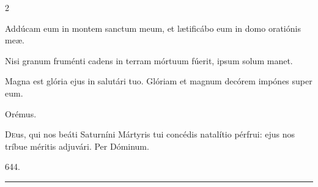 \documentclass[9pt,twoside]{extarticle}
\begin{document}
\begin{multicols}{2}
\begin{tightlist}{}
\item {} Addúcam eum in montem sanctum meum, et lætificábo eum in domo oratiónis meæ. 
\item {}
\item {}
\item {} Nisi granum fruménti cadens in terram mórtuum fúerit, ipsum solum manet.
\item {} Magna est glória ejus in salutári tuo.  Glóriam et magnum decórem impónes super eum.
\item Orémus. \hfill {}
\end{tightlist}
\lettrine{D}eus, qui nos beáti Saturníni Mártyris tui concédis natalítio pérfrui: ejus nos tríbue méritis adjuvári. Per Dóminum.

\begin{tightlist}{}
\item {}
\item {} 644.
\end{tightlist}

\begin{center}\textcolor{red}{\rule{\linewidth}{0.5pt}} \end{center}



\end{multicols}
\end{document}
